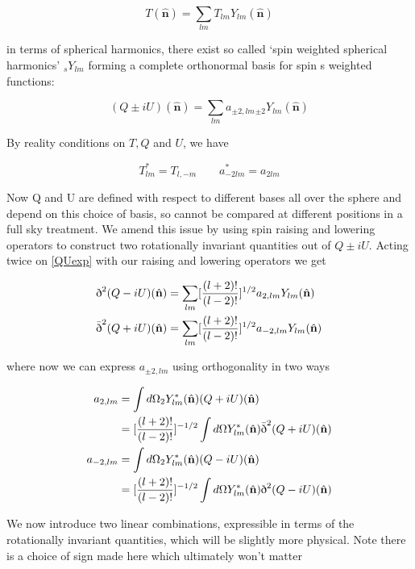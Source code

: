 \documentclass[a4paper,11pt]{article}
\renewcommand{\v}[1]{\mathbf{#1}}
\newcommand{\unit}[1]{\hat{\v{#1}}}
\newcommand{\sr}{\text{\normalfont\dh}}
\renewcommand{\sl}{\bar{\text{\normalfont\dh}}}
\newcommand{\ltwo}{[\frac{(l+2)!}{(l-2)!}]}
\begin{document}
\begin{equation}
T(\unit{n}) = \sum_{lm} T_{lm}Y_{lm}(\unit{n})
\end{equation}

in terms of spherical harmonics, there exist so called `spin weighted spherical harmonics' $_sY_{lm}$ forming a complete orthonormal basis for spin s weighted functions:

\begin{equation}
(Q\pm iU)(\unit{n}) = \sum_{lm} a_{\pm2,lm} {}_{\pm2}Y_{lm}(\unit{n})
\label{QUexp}
\end{equation}

By reality conditions on $T, Q$ and $U$, we have

\begin{equation}
T_{lm}^* = T_{l,-m} \qquad a_{-2lm}^*=a_{2lm}
\end{equation}

Now Q and U are defined with respect to different bases all over the sphere and depend on this choice of basis, so cannot be compared at different positions in a full sky treatment. We amend this issue by using spin raising and lowering operators to construct two rotationally invariant quantities out of $Q\pm iU$. Acting twice on \ref{QUexp} with our raising and lowering operators we get

\begin{align}
\sr^2(Q-iU)(\unit{n}) &= \sum_{lm} \ltwo^{1/2} a_{2,lm} {}Y_{lm}(\unit{n})\\
\sl^2(Q+iU)(\unit{n}) &= \sum_{lm} \ltwo^{1/2} a_{-2,lm} {}Y_{lm}(\unit{n})
\end{align}

where now we can express $a_{\pm2,lm}$ using orthogonality in two ways


\begin{align}
a_{2,lm} &= \int d\Omega {}_2Y_{lm}^*(\unit{n})(Q+iU)(\unit{n})\\
&= \ltwo^{-1/2}\int d\Omega Y_{lm}^*(\unit{n})\sl^2(Q+iU)(\unit{n})\\
a_{-2,lm} &= \int d\Omega {}_2Y_{lm}^*(\unit{n})(Q-iU)(\unit{n})\\
&= \ltwo^{-1/2}\int d\Omega Y_{lm}^*(\unit{n})\sr^2(Q-iU)(\unit{n})
\end{align}

We now introduce two linear combinations, expressible in terms of the rotationally invariant quantities, which will be slightly more physical. Note there is a choice of sign made here which ultimately won't matter
\end{document}
